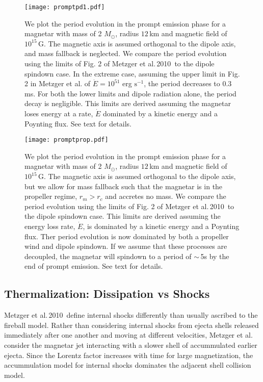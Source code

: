 \documentclass{article}
\begin{document}
\begin{figure}[h!]
\centering
\texttt{[image: promptpd1.pdf]}
\caption{We plot the period evolution in the prompt emission phase for a magnetar with mass of 2 $M_{\odot}$, radius $12$\,km and magnetic field of $10^{15}$\,G. The magnetic axis is assumed orthogonal to the dipole axis, and mass fallback is neglected. We compare the period evolution using the limits of Fig. 2 of Metzger et al.\,2010\,\cite{Metzger:2010pp} to the dipole spindown case. In the extreme case, assuming the upper limit in Fig. 2 in Metzger et al. of $\dot{E}=10^{51}$ erg $\mathrm{s}^{-1}$, the period decreases to 0.3 ms. For both the lower limits and dipole radiation alone, the period decay is negligible. This limits are derived assuming the magnetar loses energy at a rate, $\dot{E}$ dominated by a kinetic energy and a Poynting flux. See text for details.}
\label{fig:7}
\end{figure}

\begin{figure}[h!]
\centering
\texttt{[image: promptprop.pdf]}
\caption{We plot the period evolution in the prompt emission phase for a magnetar with mass of 2 $M_{\odot}$, radius $12$\,km and magnetic field of $10^{15}$\,G. The magnetic axis is assumed orthogonal to the dipole axis, but we allow for mass fallback such that the magnetar is in the propeller regime, $r_m > r_c$ and accretes no mass. We compare the period evolution using the limits of Fig. 2 of Metzger et al.\,2010\,\cite{Metzger:2010pp} to the dipole spindown case. This limits are derived assuming the energy loss rate, $\dot{E}$, is dominated by a kinetic energy and a Poynting flux. Ther period evolution is now dominated by both a propeller wind and dipole spindown. If we assume that these processes are decoupled, the magnetar will spindown to a period of $\sim$\,5s by the end of prompt emission. See text for details.}
\label{fig:pprop}
\end{figure}

\subsection{Thermalization: Dissipation vs Shocks} \label{sec:therm}

Metzger et al.\,2010\,\cite{Metzger:2010pp} define internal shocks differently than usually ascribed to the fireball model. Rather than considering internal shocks from ejecta shells released immediately after one another and moving at different velocities, Metzger et al. consider the magnetar jet interacting with a slower shell of accummulated earlier ejecta. Since the Lorentz factor increases with time for large magnetization, the accummulation model for internal shocks dominates the adjacent shell collision model.
\end{document}
